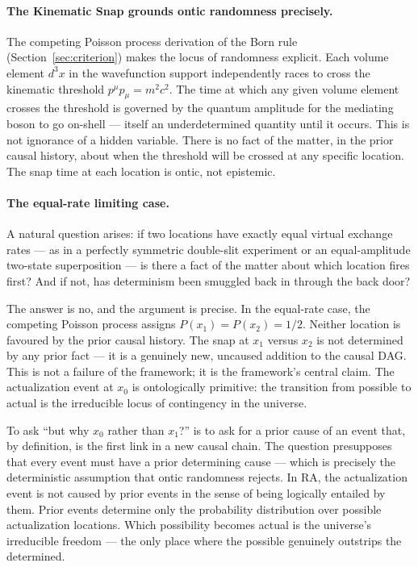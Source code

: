 \documentclass[11pt,a4paper]{article}
\theoremstyle{plain}
\theoremstyle{definition}
\theoremstyle{remark}
\begin{document}
\paragraph{The Kinematic Snap grounds ontic randomness precisely.}
The competing Poisson process derivation of the Born rule (Section~\ref{sec:criterion})
makes the locus of randomness explicit. Each volume element $d^3x$ in the wavefunction
support independently races to cross the kinematic threshold $p^\mu p_\mu = m^2c^2$.
The time at which any given volume element crosses the threshold is governed by the
quantum amplitude for the mediating boson to go on-shell --- itself an underdetermined
quantity until it occurs. This is not ignorance of a hidden variable. There is no
fact of the matter, in the prior causal history, about when the threshold will be
crossed at any specific location. The snap time at each location is ontic, not
epistemic.

\paragraph{The equal-rate limiting case.}
A natural question arises: if two locations have exactly equal virtual exchange
rates --- as in a perfectly symmetric double-slit experiment or an equal-amplitude
two-state superposition --- is there a fact of the matter about which location fires
first? And if not, has determinism been smuggled back in through the back door?

The answer is no, and the argument is precise. In the equal-rate case, the
competing Poisson process assigns $P(x_1) = P(x_2) = 1/2$. Neither location is
favoured by the prior causal history. The snap at $x_1$ versus $x_2$ is not
determined by any prior fact --- it is a genuinely new, uncaused addition to the
causal DAG. This is not a failure of the framework; it is the framework's central
claim. The actualization event at $x_0$ is ontologically primitive: the transition
from possible to actual is the irreducible locus of contingency in the universe.

To ask ``but why $x_0$ rather than $x_1$?'' is to ask for a prior cause of an
event that, by definition, is the first link in a new causal chain. The question
presupposes that every event must have a prior determining cause --- which is
precisely the deterministic assumption that ontic randomness rejects. In RA, the
actualization event is not caused by prior events in the sense of being logically
entailed by them. Prior events determine only the probability distribution over
possible actualization locations. Which possibility becomes actual is the
universe's irreducible freedom --- the only place where the possible genuinely
outstrips the determined.
\end{document}
